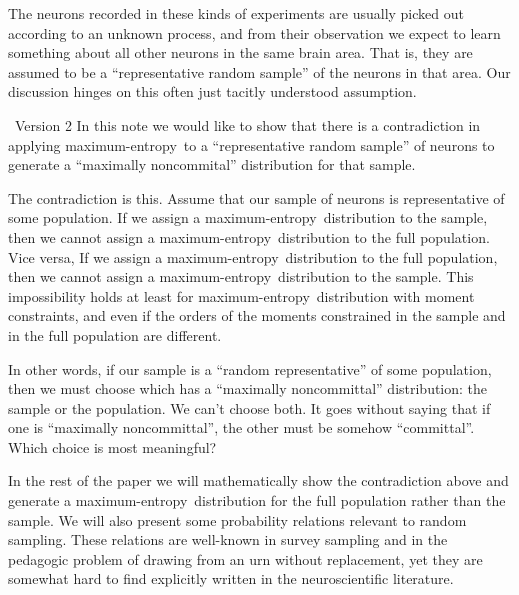 \documentclass{article}
\theoremstyle{remark}
\theoremstyle{innote}
\renewcommand*{\|}{\mathpunct{|}}%
\theoremstyle{simple}
\newcommand*{\puzzle}{{\fontencoding{U}\fontfamily{fontawesometwo}\selectfont\symbol{225}}}
\newcommand{\mynote}[1]{ {\color{notecolour}\puzzle\ #1}}
\newcommand*{\me}{maximum-entropy}
\begin{document}
The neurons recorded in these kinds of experiments are usually picked out
according to an unknown process, and from their observation we expect to
learn something about all other neurons in the same brain area. That is,
they are assumed to be a \enquote{representative random sample} of the
neurons in that area. Our discussion hinges on this often just tacitly
understood assumption.


\mynote{Version 2 }
In this note we would like to show that there is a
contradiction in applying \me\ to a \enquote{representative random sample}
of neurons to generate a \enquote{maximally noncommital} distribution for
that sample.

The contradiction is this. Assume that our sample of neurons is
representative of some population. If we assign a \me\ distribution to the
sample, then we cannot assign a \me\ distribution to the full population.
Vice versa, If we assign a \me\ distribution to the full population, then
we cannot assign a \me\ distribution to the sample. This impossibility
holds at least for \me\ distribution with moment constraints, and even if
the orders of the moments constrained in the sample and in the full
population are different.

In other words, if our sample is a \enquote{random representative} of some
population, then we must choose which has a \enquote{maximally
  noncommittal} distribution: the sample or the population. We can't choose
both. It goes without saying that if one is \enquote{maximally
  noncommittal}, the other must be somehow \enquote{committal}. Which
choice is most meaningful?

In the rest of the paper we will mathematically show the contradiction
above and generate a \me\ distribution for the full population rather than
the sample. We will also present some probability relations relevant to
random sampling. These relations are well-known in survey sampling and in
the pedagogic problem of drawing from an urn without replacement, yet they
are somewhat hard to find explicitly written in the neuroscientific
literature.
\fi
\end{document}
